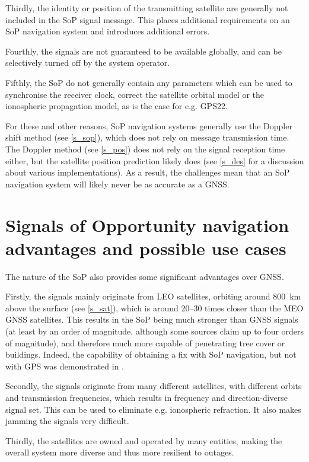 Thirdly, the identity or position of the transmitting satellite are generally not included in the SoP signal message. This places additional requirements on an SoP navigation system and introduces additional errors.

Fourthly, the signals are not guaranteed to be available globally, and can be selectively turned off by the system operator.

Fifthly, the SoP do not generally contain any parameters which can be used to synchronise the receiver clock, correct the satellite orbital model or the ionospheric propagation model, as is the case for e.g. GPS\citep{pos04}{22}.

For these and other reasons, SoP navigation systems generally use the Doppler shift method (see \autoref{s_sop}), which does not rely on message transmission time. The Doppler method (see \autoref{s_pos}) does not rely on the signal reception time either, but the satellite position prediction likely does (see \autoref{s_des} for a discussion about various implementations). As a result, the challenges mean that an SoP navigation system will likely never be as accurate as a GNSS.



\section{Signals of Opportunity navigation advantages and possible use cases}
\label{s_int_use_cases}
The nature of the SoP also provides some significant advantages over GNSS.

Firstly, the signals mainly originate from LEO satellites, orbiting around \qty{800}{km} above the surface (see \autoref{s_sat}), which is around \numrange{20}{30} times closer than the MEO GNSS satellites. This results in the SoP being much stronger than GNSS signals (at least by an order of magnitude, although some sources claim up to four orders of magnitude\cite{sop08}), and therefore much more capable of penetrating tree cover or buildings. Indeed, the capability of obtaining a fix with SoP navigation, but not with GPS was demonstrated in \cite{sop12}.

Secondly, the signals originate from many different satellites, with different orbits and transmission frequencies, which results in frequency and direction-diverse signal set. This can be used to eliminate e.g. ionospheric refraction. It also makes jamming the signals very difficult.

Thirdly, the satellites are owned and operated by many entities, making the overall system more diverse and thus more resilient to outages.

